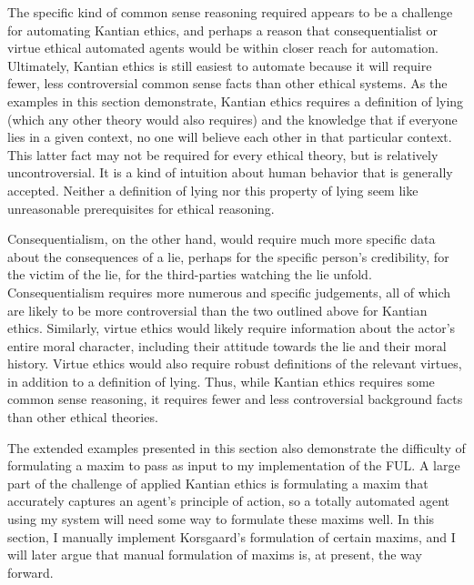 \begin{isabellebody}
\begin{isamarkuptext}
The specific kind of common sense reasoning required appears to be a challenge 
for automating Kantian ethics, and perhaps a reason that consequentialist or virtue ethical automated
agents would be within closer reach for automation. Ultimately, Kantian ethics is still
easiest to automate because it will require fewer, less controversial common sense facts than other ethical
systems. As the examples in this section demonstrate, Kantian ethics requires a definition of lying (which any other 
theory would also requires) and the knowledge that if everyone lies in a given context, no one will believe 
each other in that particular context. This latter fact may not be required for every ethical theory, 
but is relatively uncontroversial. It is a kind of intuition about human behavior that is generally accepted. 
Neither a definition of lying nor this property of lying seem like unreasonable prerequisites for ethical reasoning. 

Consequentialism, on the other hand, would require much more specific data about the consequences of 
a lie, perhaps for the specific person's credibility, for the victim of the lie, for the third-parties 
watching the lie unfold. Consequentialism requires more numerous and specific judgements, all of which are 
likely to be more controversial than the two outlined above for Kantian ethics. Similarly, virtue ethics
would likely require information about the actor's entire moral character, including their attitude
towards the lie and their moral history. Virtue ethics would also require robust definitions of the 
relevant virtues, in addition to a definition of lying. Thus, while Kantian ethics requires some 
common sense reasoning, it requires fewer and less controversial background facts than other ethical theories.

The extended examples presented in this section also demonstrate the difficulty of formulating a 
maxim to pass as input to my implementation of the FUL. A large part of the challenge of applied Kantian
ethics is formulating a maxim that accurately captures an agent's principle of action, so a totally
automated agent using my system will need some way to formulate these maxims well. In this section,
I manually implement Korsgaard's formulation of certain maxims, and I will later argue that manual formulation
of maxims is, at present, the way forward. 


\end{isamarkuptext}
\end{isabellebody}
